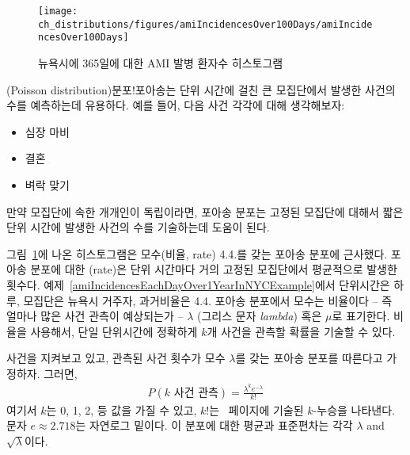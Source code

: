 \begin{figure}[h]
\centering
\texttt{[image: ch\_distributions/figures/amiIncidencesOver100Days/amiIncidencesOver100Days]}
\caption{뉴욕시에 365일에 대한 AMI 발병 환자수 히스토그램}
\label{amiIncidencesOver100Days}
\end{figure}

(Poisson distribution){분포!포아송}는 단위 시간에 걸친 큰 모집단에서 발생한 사건의 수를 예측하는데 유용하다. 예를 들어, 다음 사건 각각에 대해 생각해보자:
\begin{itemize}
\setlength{\itemsep}{0mm}
\item 심장 마비
\item 결혼
\item 벼락 맞기
\end{itemize}

만약 모집단에 속한 개개인이 독립이라면, 포아송 분포는 고정된 모집단에 대해서 짧은 단위 시간에 발생한 사건의 수를 기술하는데 도움이 된다. 

그림~\ref{amiIncidencesOver100Days}에 나온 히스토그램은 모수(비율, rate) 4.4.를 갖는 포아송 분포에 근사했다. 포아송 분포에 대한 (rate)은 단위 시간마다 거의 고정된 모집단에서 평균적으로 발생한 횟수다.  예제~\ref{amiIncidencesEachDayOver1YearInNYCExample}에서 단위시간은 하루, 모집단은 뉴욕시 거주자, 과거비율은 4.4. 포아송 분포에서 모수는 비율이다 -- 즉 얼마나 많은 사건 관측이 예상되는가 -- $\lambda$
(그리스 문자 \emph{lambda})  혹은 $\mu$로 표기한다. 비율을 사용해서, 단일 단위시간에 정확하게 $k$개 사건을 관측할 확률을 기술할 수 있다.

\begin{termBox}{
사건을 지켜보고 있고, 관측된 사건 횟수가 모수 $\lambda$를 갖는 포아송 분포를 따른다고 가정하자. 그러면,
\begin{align*}
P(\text{$k$ 사건 관측}) = \frac{\lambda^{k} e^{-\lambda}}{k!}
\end{align*}
여기서 $k$는 0, 1, 2, 등 값을 가질 수 있고, $k!$는 \pageref{factorialDefinitionInTheBinomialSection}~페이지에 기술된 $k$-누승을 나타낸다. 문자 $e\approx2.718$는 자연로그 밑이다. 이 분포에 대한 평균과 표준편차는 각각 $\lambda$ and $\sqrt{\lambda}$이다.}
\end{termBox}

